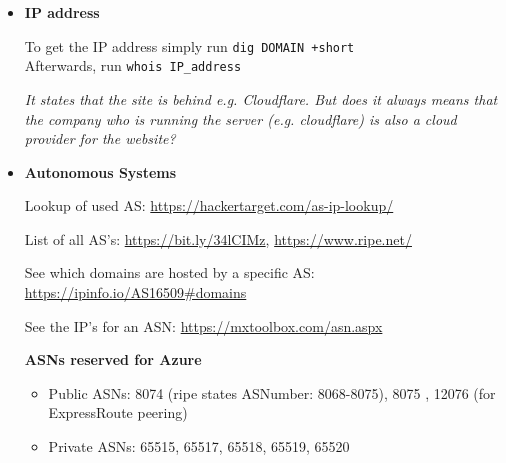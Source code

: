 \documentclass[12pt]{article}
\begin{document}
\begin{itemize}
    
    \item \textbf{IP address}
    
    To get the IP address simply run \verb|dig DOMAIN +short| \\
    Afterwards, run \verb|whois IP_address| 
    
    \textit{It states that the site is behind e.g. Cloudflare. But does it always means that the company who is running the server (e.g. cloudflare) is also a cloud provider for the website?}
    
    
    \item \textbf{Autonomous Systems}
    
    Lookup of used AS: \url{https://hackertarget.com/as-ip-lookup/}
    
    List of all AS's: \url{https://bit.ly/34lCIMz}, \url{https://www.ripe.net/}
    
    See which domains are hosted by a specific AS: \url{https://ipinfo.io/AS16509#domains}
        
    See the IP's for an ASN: \url{https://mxtoolbox.com/asn.aspx}
    
	\textbf{ASNs reserved for Azure}
    \begin{itemize}
        \item Public ASNs: 8074 (ripe states ASNumber: 8068-8075), 8075 , 12076 (for ExpressRoute peering)
        \item Private ASNs: 65515, 65517, 65518, 65519, 65520
    \end{itemize}    
    

\end{itemize}
\end{document}
